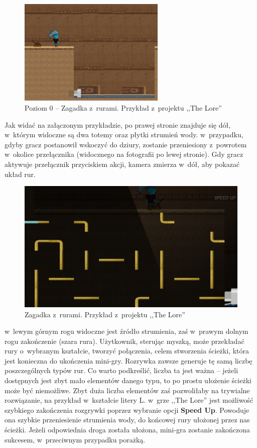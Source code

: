 \documentclass[oneside,polski,logo]{amuthesis}
\begin{document}
\begin{figure}[h]
	\centering
	\includegraphics[width=7cm]{images/tyrek/ruryLvl0.png}
	\caption{Poziom 0 – Zagadka z~rurami. Przykład z~projektu ,,The Lore''}
\end{figure}

Jak widać na załączonym przykładzie, po prawej stronie znajduje się dół, w~którym widoczne są dwa totemy oraz płytki strumień wody. w~przypadku, gdyby gracz postanowił wskoczyć do dziury, zostanie przeniesiony z~powrotem w~okolice przełącznika (widocznego na fotografii po lewej stronie). Gdy gracz aktywuje przełącznik przyciskiem akcji, kamera zmierza w~dół, aby pokazać układ rur.

\begin{figure}[h]
	\centering
	\includegraphics[width=12cm]{images/tyrek/pipes.png}
	\caption{Zagadka z~rurami. Przykład z~projektu ,,The Lore''}
\end{figure}

w~lewym górnym rogu widoczne jest źródło strumienia, zaś w~prawym dolnym rogu zakończenie (szara rura). Użytkownik, sterując myszką, może przekładać rury o~wybranym kształcie, tworzyć połączenia, celem stworzenia ścieżki, która jest konieczna do ukończenia mini-gry. Rozrywka zawsze generuje tę samą liczbę poszczególnych typów rur. Co warto podkreślić, liczba ta jest ważna – jeżeli dostępnych jest zbyt mało elementów danego typu, to po prostu ułożenie ścieżki może być niemożliwe. Zbyt duża liczba elementów zaś pozwoliłaby na trywialne rozwiązanie, na przykład w~kształcie litery L. w~grze ,,The Lore'' jest możliwość szybkiego zakończenia rozgrywki poprzez wybranie opcji \textbf{Speed Up}. Powoduje ona szybkie przeniesienie strumienia wody, do końcowej rury ułożonej przez nas ścieżki. Jeżeli odpowiednia droga została ułożona, mini-gra zostanie zakończona sukcesem, w~przeciwnym przypadku porażką.
\end{document}
